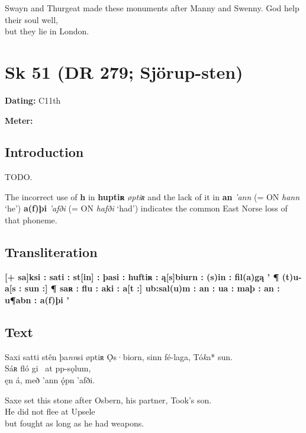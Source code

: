 \bpb Swayn and Thurgeat made these monuments after Manny and Swenny.  God help their soul well, \\
but they lie in London.\epb\epg

\sectionline\newpage


\section{Sk 51 (DR 279; Sjörup-sten)}

\begin{flushright}%
\textbf{Dating:} C11th

\textbf{Meter:} \Ljodahattr
\end{flushright}%

\subsection{Introduction}

TODO.

The incorrect use of \textbf{h} in \textbf{huptiʀ} \emph{øptiʀ} and the lack of it in \textbf{an} \emph{’ann} (= ON \emph{hann} ‘he’) \textbf{a(f)þi} \emph{’afði} (= ON \emph{hafði} ‘had’) indicates the common East Norse loss of that phoneme.

\subsection{Transliteration}

\textbf{[+ sa]ksi : sati : st[in] : þasi : huftiʀ : ą[s]biurn : (s)in : fil(a)gą ’ ¶ (t)u-a[s : sun :] ¶ saʀ : flu : aki : a[t :] ub:sal(u)m : an : ua : maþ : an : u¶abn : a(f)þi ’}

\subsection{Text}

\bpg\bpa[0]%
\startsub Saxi satti stên þa\emph{nn}si øptiʀ Ǫ̇s·biorn, sinn fé-laga, Tó\emph{k}a* sun.\endsub \\
Sáʀ fló gi \hld\ at pp-sǫlum, \\
\ind ęn á, með ’ann ǫ́pn ’afði.\epa

\bpb Saxe set this stone after Osbern, his partner, Took’s son. \\
He did not flee at Upsele \\
\ind but fought as long as he had weapons.\epb\epg

\sectionline\newpage


